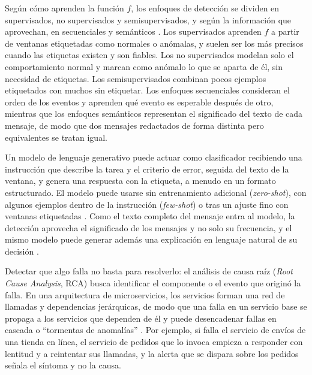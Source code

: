 
Según cómo aprenden la función $f$, los enfoques de detección se dividen en supervisados, no supervisados y semisupervisados, y según la información que aprovechan, en secuenciales y semánticos \cite{jiang2021_aiops} \cite{he2021_survey}. Los supervisados aprenden $f$ a partir de ventanas etiquetadas como normales o anómalas, y suelen ser los más precisos cuando las etiquetas existen y son fiables. Los no supervisados modelan solo el comportamiento normal y marcan como anómalo lo que se aparta de él, sin necesidad de etiquetas. Los semisupervisados combinan pocos ejemplos etiquetados con muchos sin etiquetar. Los enfoques secuenciales consideran el orden de los eventos y aprenden qué evento es esperable después de otro, mientras que los enfoques semánticos representan el significado del texto de cada mensaje, de modo que dos mensajes redactados de forma distinta pero equivalentes se tratan igual.


Un modelo de lenguaje generativo puede actuar como clasificador recibiendo una instrucción que describe la tarea y el criterio de error, seguida del texto de la ventana, y genera una respuesta con la etiqueta, a menudo en un formato estructurado. El modelo puede usarse sin entrenamiento adicional (\textit{zero-shot}), con algunos ejemplos dentro de la instrucción (\textit{few-shot}) o tras un ajuste fino con ventanas etiquetadas \cite{liu2024_logprompt}. Como el texto completo del mensaje entra al modelo, la detección aprovecha el significado de los mensajes y no solo su frecuencia, y el mismo modelo puede generar además una explicación en lenguaje natural de su decisión \cite{lim2025_logadreft}.

Detectar que algo falla no basta para resolverlo: el análisis de causa raíz (\textit{Root Cause Analysis}, RCA) busca identificar el componente o el evento que originó la falla. En una arquitectura de microservicios, los servicios forman una red de llamadas y dependencias jerárquicas, de modo que una falla en un servicio base se propaga a los servicios que dependen de él y puede desencadenar fallas en cascada o ``tormentas de anomalías'' \cite{wang2024_rca}. Por ejemplo, si falla el servicio de envíos de una tienda en línea, el servicio de pedidos que lo invoca empieza a responder con lentitud y a reintentar sus llamadas, y la alerta que se dispara sobre los pedidos señala el síntoma y no la causa.

